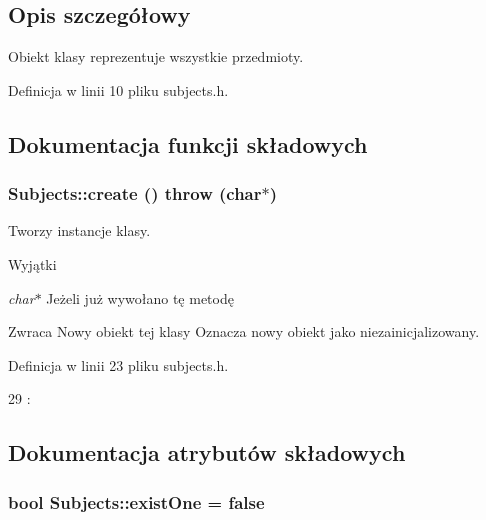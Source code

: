 \subsection{Opis szczegółowy}
Obiekt klasy reprezentuje wszystkie przedmioty. 

Definicja w linii 10 pliku subjects.h.



\subsection{Dokumentacja funkcji składowych}
\hypertarget{classSubjects_aec561b25eff855874861326e29efb743}{
\subsubsection[{create}]{ Subjects::create ()  throw (char$\ast$)}}
\label{classSubjects_aec561b25eff855874861326e29efb743}


Tworzy instancje klasy. 


\begin{DoxyExceptions}{Wyjątki}
\item[{\em char$\ast$}]Jeżeli już wywołano tę metodę \end{DoxyExceptions}
\begin{DoxyReturn}{Zwraca}
Nowy obiekt tej klasy Oznacza nowy obiekt jako niezainicjalizowany. 
\end{DoxyReturn}


Definicja w linii 23 pliku subjects.h.




\begin{DoxyCode}
29        :
\end{DoxyCode}




\subsection{Dokumentacja atrybutów składowych}
\hypertarget{classSubjects_ae5f842f095e3091ce71261dc415435f8}{
\subsubsection[{existOne}]{\setlength{\rightskip}{0pt plus 5cm}bool {\bf Subjects::existOne} = false}}
\label{classSubjects_ae5f842f095e3091ce71261dc415435f8}


